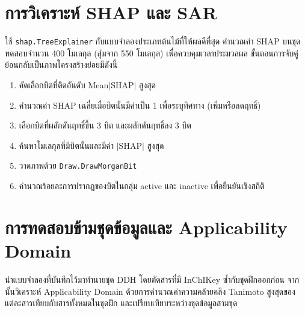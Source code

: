 \section{การวิเคราะห์ SHAP และ SAR}

ใช้ \texttt{shap.TreeExplainer} กับแบบจำลองประเภทต้นไม้ที่ให้ผลดีที่สุด คำนวณค่า SHAP บนชุดทดสอบจำนวน 400 โมเลกุล (สุ่มจาก 550 โมเลกุล) เพื่อควบคุมเวลาประมวลผล ขั้นตอนการจับคู่ย้อนกลับเป็นภาพโครงสร้างย่อยมีดังนี้

\begin{enumerate}[leftmargin=2em, itemsep=0.3em]
  \item คัดเลือกบิตที่ติดอันดับ Mean$|$SHAP$|$ สูงสุด
  \item คำนวณค่า SHAP เฉลี่ยเมื่อบิตนั้นมีค่าเป็น 1 เพื่อระบุทิศทาง (เพิ่มหรือลดฤทธิ์)
  \item เลือกบิตที่ผลักดันฤทธิ์ขึ้น 3 บิต และผลักดันฤทธิ์ลง 3 บิต
  \item ค้นหาโมเลกุลที่มีบิตนั้นและมีค่า $|$SHAP$|$ สูงสุด
  \item วาดภาพด้วย \texttt{Draw.DrawMorganBit}
  \item คำนวณร้อยละการปรากฏของบิตในกลุ่ม active และ inactive เพื่อยืนยันเชิงสถิติ
\end{enumerate}

\section{การทดสอบข้ามชุดข้อมูลและ Applicability Domain}

นำแบบจำลองที่บันทึกไว้มาทำนายชุด DDH โดยตัดสารที่มี InChIKey ซ้ำกับชุดฝึกออกก่อน จากนั้นวิเคราะห์ Applicability Domain ด้วยการคำนวณค่าความคล้ายคลึง Tanimoto สูงสุดของแต่ละสารเทียบกับสารทั้งหมดในชุดฝึก และเปรียบเทียบระหว่างชุดข้อมูลสามชุด
